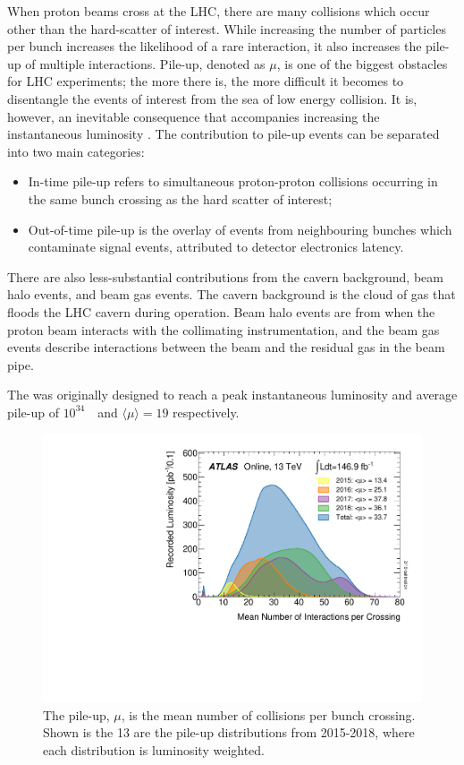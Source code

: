 When proton beams cross at the LHC, there are many collisions which occur other than the hard-scatter of interest. While increasing the number of particles per bunch increases the likelihood of a rare interaction, it also increases the pile-up of multiple interactions. Pile-up, denoted as $\mu$, is one of the biggest obstacles for LHC experiments; the more there is, the more difficult it becomes to disentangle the events of interest from the sea of low energy collision. It is, however, an inevitable consequence that accompanies increasing the instantaneous luminosity . The contribution to pile-up events can be separated into two main categories: 
\begin{itemize}
  \item In-time pile-up refers to simultaneous proton-proton collisions occurring in the same bunch crossing as the hard scatter of interest;
  \item Out-of-time pile-up is the overlay of events from neighbouring bunches which contaminate signal events, attributed to detector electronics latency.
\end{itemize}
There are also less-substantial contributions from the cavern background, beam halo events, and beam gas events. The cavern background is the cloud of gas that floods the LHC cavern during operation. Beam halo events are from when the proton beam interacts with the collimating instrumentation, and the beam gas events describe interactions between the beam and the residual gas in the beam pipe. 

The \LHC was originally designed to reach a peak instantaneous luminosity and average pile-up of \unit{$10^{34}$}{\rpsquare{\cm}\reciprocal{\second}} and $\langle\mu\rangle=19$ respectively. 

\begin{figure}
  \includegraphics[width=\smallfigwidth]{Figures/LHC/PileUp_2015_2018.pdf}
  \caption[Pile-up distributions.]
  {The pile-up, $\mu$, is the mean number of collisions per bunch crossing. Shown is the \unit{13}{\TeV} are the pile-up distributions from 2015-2018, where each distribution is luminosity weighted.}
  \label{fig:Pileup}
\end{figure}
